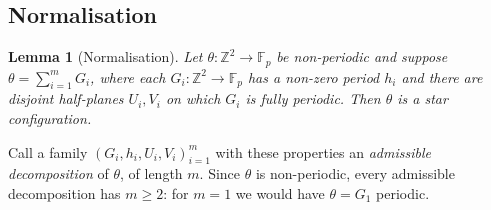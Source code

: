 \documentclass[11pt,reqno]{amsart}
\theoremstyle{plain}
\newtheorem{lem}[thm]{Lemma}
\theoremstyle{definition}
\theoremstyle{remark}
\theoremstyle{plain}
\theoremstyle{remark}
\theoremstyle{definition}
\numberwithin{equation}{section}
\newcommand{\Z}{\mathbb{Z}}
\newcommand{\Fp}{\mathbb{F}_p}
\begin{document}
\subsection{Normalisation}\label{ssec:normalisation}

\begin{lem}[Normalisation]\label{lem:normalise}
Let $\theta\colon\Z^2\to\Fp$ be non-periodic and suppose
$\theta=\sum_{i=1}^mG_i$, where each $G_i\colon\Z^2\to\Fp$ has a non-zero period
$h_i$ and there are disjoint half-planes $U_i,V_i$ on which $G_i$ is fully
periodic.  Then $\theta$ is a star configuration.
\end{lem}

Call a family $(G_i,h_i,U_i,V_i)_{i=1}^m$ with these properties an
\emph{admissible decomposition} of $\theta$, of length $m$.  Since $\theta$ is
non-periodic, every admissible decomposition has $m\ge2$: for $m=1$ we would
have $\theta=G_1$ periodic.
\end{document}

